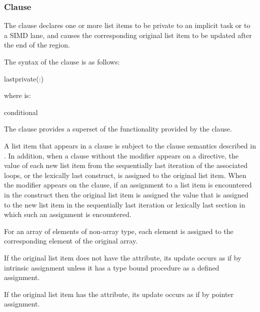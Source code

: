 \subsubsection{ Clause}
\label{subsubsec:lastprivate clause}
\summary
The  clause declares one or more list items to be private to 
an implicit task or to a SIMD lane, and causes the corresponding original list 
item to be updated after the end of the region.

\syntax
The syntax of the  clause is as follows:

\begin{ompSyntax}
lastprivate(\plc{[ lastprivate-modifier}:\plc{] list})
\end{ompSyntax}

where  is:
\begin{indentedcodelist}
conditional
\end{indentedcodelist}

\descr
The  clause provides a superset of the functionality provided 
by the  clause.

A list item that appears in a  clause is subject to the 
 clause semantics described in .
In addition, when a  clause without the  
modifier appears on a directive, the value of each new list item from the 
sequentially last iteration of the associated loops, or the lexically last 
 construct, is assigned to the original list item. When the 
 modifier appears on the clause, if an assignment to a list 
item is encountered in the construct then the original list item is assigned 
the value that is assigned to the new list item in the sequentially last 
iteration or lexically last section in which such an assignment is encountered.

\begin{ccppspecific}
For an array of elements of non-array type, each element is assigned to the
corresponding element of the original array.
\end{ccppspecific}

\begin{fortranspecific}
If the original list item does not have the  attribute,
its update occurs as if by intrinsic assignment unless it has a type
bound procedure as a defined assignment.

If the original list item has the  attribute, its update 
occurs as if by pointer assignment.
\end{fortranspecific}

